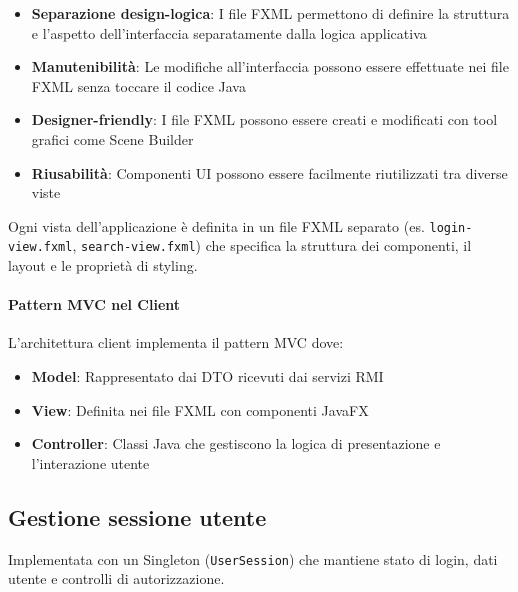\begin{itemize}
    \item \textbf{Separazione design-logica}: I file FXML permettono di definire la struttura e l'aspetto dell'interfaccia separatamente dalla logica applicativa
    \item \textbf{Manutenibilità}: Le modifiche all'interfaccia possono essere effettuate nei file FXML senza toccare il codice Java
    \item \textbf{Designer-friendly}: I file FXML possono essere creati e modificati con tool grafici come Scene Builder
    \item \textbf{Riusabilità}: Componenti UI possono essere facilmente riutilizzati tra diverse viste
\end{itemize}

Ogni vista dell'applicazione è definita in un file FXML separato (es. \texttt{login-view.fxml}, \texttt{search-view.fxml}) che specifica la struttura dei componenti, il layout e le proprietà di styling.

\paragraph{Pattern MVC nel Client}
L'architettura client implementa il pattern MVC dove:
\begin{itemize}
    \item \textbf{Model}: Rappresentato dai DTO ricevuti dai servizi RMI
    \item \textbf{View}: Definita nei file FXML con componenti JavaFX
    \item \textbf{Controller}: Classi Java che gestiscono la logica di presentazione e l'interazione utente
\end{itemize}

\subsection{Gestione sessione utente}
Implementata con un Singleton (\texttt{UserSession}) che mantiene stato di login, dati utente e controlli di autorizzazione.
